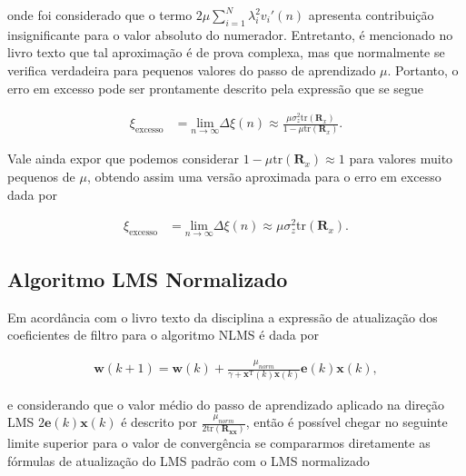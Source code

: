 \begin{enumerate}
        onde foi considerado que o termo $2 \mu \sum^{N}_{i = 1} \lambda^{2}_{i} v_{i}'(n)$ apresenta contribuição insignificante para o valor absoluto do numerador. Entretanto, é mencionado no livro texto que tal aproximação é de prova complexa, mas que normalmente 
        se verifica verdadeira para pequenos valores do passo de aprendizado $\mu$. Portanto, o erro em excesso pode ser prontamente descrito pela expressão que se segue

        \begin{align}
            \xi_{\text{excesso}} &= \underset{n \rightarrow \infty}{\text{lim}} \Delta \xi(n) \approx \frac{\mu \sigma^{2}_{z} \text{tr}(\mathbf{R}_{x})}{1 - \mu \text{tr}(\mathbf{R}_{x})}.
        \end{align}

        Vale ainda expor que podemos considerar $1 - \mu \text{tr}(\mathbf{R}_{x}) \approx 1$ para valores muito pequenos de $\mu$, obtendo assim uma versão aproximada para o erro em excesso dada por
        
        \begin{align}
            \xi_{\text{excesso}} &= \underset{n \rightarrow \infty}{\text{lim}} \Delta \xi(n) \approx \mu \sigma^{2}_{z} \text{tr}(\mathbf{R}_{x}).
        \end{align}

\end{enumerate}
\clearpage


\subsection{Algoritmo LMS Normalizado} %
Em acordância com o livro texto da disciplina a expressão de atualização dos coeficientes de filtro para o algoritmo NLMS é dada por

\begin{align}
    \mathbf{w}(k+1) = \mathbf{w}(k) + \frac{\mu_{norm}}{\gamma + \mathbf{x}^{\text{T}}(k) \mathbf{x}(k)} \mathbf{e}(k) \mathbf{x}(k),
\end{align}

e considerando que o valor médio do passo de aprendizado aplicado na direção LMS $2 \mathbf{e}(k) \mathbf{x}(k)$ é descrito por $\frac{\mu_{norm}}{2 \text{tr}(\mathbf{R_{xx}})}$, então é possível chegar
no seguinte limite superior para o valor de convergência se compararmos diretamente as fórmulas de atualização do LMS padrão com o LMS normalizado

